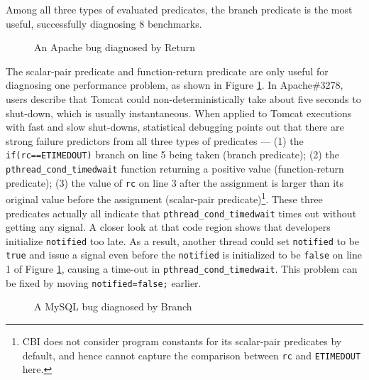 Among all three types of evaluated predicates, the branch predicate is the most
useful, successfully diagnosing 8 benchmarks.

\begin{figure}
\caption{An Apache bug diagnosed by Return}
\label{fig:Apache3278}
\end{figure}


The scalar-pair predicate and function-return predicate are only useful
for diagnosing one performance problem, as shown in 
Figure \ref{fig:Apache3278}.
In Apache\#3278, users describe that Tomcat could
non-deterministically take about five seconds to shut-down, which is usually
instantaneous. When applied to Tomcat executions
with fast and slow shut-downs, statistical debugging points out that there are
strong failure predictors from all three types of predicates --- 
(1) the \texttt{if(rc==ETIMEDOUT)} branch on line 5 being taken (branch predicate);
(2) the \texttt{pthread\_cond\_timedwait} function returning 
a positive value (function-return predicate);
(3) the value of \texttt{rc} on line 3 after the assignment is larger than its
original value before the assignment 
(scalar-pair predicate)\footnote{CBI does not consider program constants
for its scalar-pair predicates by default, and hence
cannot capture the comparison between \texttt{rc} and \texttt{ETIMEDOUT} here.}.
These three predicates actually all indicate that 
\texttt{pthread\_cond\_timedwait}
times out without getting any signal. 
A closer look at that code region shows that developers initialize
\texttt{notified} too late. 
As a result, another thread
could set \texttt{notified} to be \texttt{true} and issue a signal even
before the \texttt{notified} is initialized to be \texttt{false} on line 1 of
Figure \ref{fig:Apache3278}, causing a time-out in \texttt{pthread\_cond\_timedwait}. 
This problem can be fixed by moving \texttt{notified=false;} earlier.



%

\begin{figure}
\caption{A MySQL bug diagnosed by Branch}
\label{fig:MySQL44723}
\end{figure}


%


